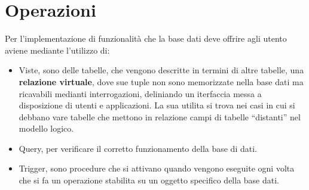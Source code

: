\chapter{Operazioni}
Per l'implementazione di funzionalità che la base dati deve offrire agli utento aviene mediante l'utilizzo di:
\begin{itemize}
\item Viste, sono delle tabelle, che vengono descritte in termini di
  altre tabelle, una \textbf{relazione virtuale}, dove sue tuple non
  sono memorizzate nella base dati ma ricavabili medianti
  interrogazioni, deliniando un iterfaccia messa a disposizione di
  utenti e applicazioni. La sua utilita si trova nei casi in cui si
  debbano vare tabelle che mettono in relazione campi di tabelle
  “distanti” nel modello logico.
\item Query, per verificare il corretto funzionamento della base di
  dati.
\item Trigger, sono procedure che si attivano quando vengono eseguite
  ogni volta che si fa un operazione stabilita su un oggetto specifico
  della base dati.
\end{itemize}




